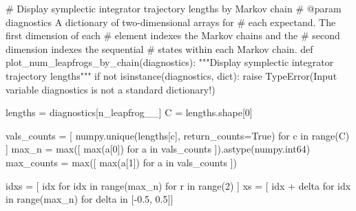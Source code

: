 \documentclass[
  letterpaper,
  DIV=11,
  numbers=noendperiod]{scrartcl}
\newenvironment{Shaded}{\begin{snugshade}}{\end{snugshade}}
\newcommand{\BuiltInTok}[1]{\textcolor[rgb]{0.00,0.23,0.31}{#1}}
\newcommand{\CommentTok}[1]{\textcolor[rgb]{0.37,0.37,0.37}{#1}}
\newcommand{\ControlFlowTok}[1]{\textcolor[rgb]{0.00,0.23,0.31}{#1}}
\newcommand{\DecValTok}[1]{\textcolor[rgb]{0.68,0.00,0.00}{#1}}
\newcommand{\FloatTok}[1]{\textcolor[rgb]{0.68,0.00,0.00}{#1}}
\newcommand{\KeywordTok}[1]{\textcolor[rgb]{0.00,0.23,0.31}{#1}}
\newcommand{\NormalTok}[1]{\textcolor[rgb]{0.00,0.23,0.31}{#1}}
\newcommand{\OperatorTok}[1]{\textcolor[rgb]{0.37,0.37,0.37}{#1}}
\newcommand{\PreprocessorTok}[1]{\textcolor[rgb]{0.68,0.00,0.00}{#1}}
\newcommand{\StringTok}[1]{\textcolor[rgb]{0.13,0.47,0.30}{#1}}
\newcommand{\VariableTok}[1]{\textcolor[rgb]{0.07,0.07,0.07}{#1}}
\begin{document}
\begin{Shaded}
\begin{Highlighting}[]
\CommentTok{\# Display symplectic integrator trajectory lengths by Markov chain}
\CommentTok{\# @param diagnostics A dictionary of two{-}dimensional arrays for}
\CommentTok{\#                    each expectand.  The first dimension of each}
\CommentTok{\#                    element indexes the Markov chains and the}
\CommentTok{\#                    second dimension indexes the sequential}
\CommentTok{\#                    states within each Markov chain.}
\KeywordTok{def}\NormalTok{ plot\_num\_leapfrogs\_by\_chain(diagnostics):}
  \CommentTok{"""Display symplectic integrator trajectory lengths"""}
  \ControlFlowTok{if} \KeywordTok{not} \BuiltInTok{isinstance}\NormalTok{(diagnostics, }\BuiltInTok{dict}\NormalTok{):}
    \ControlFlowTok{raise} \PreprocessorTok{TypeError}\NormalTok{(}\StringTok{\textquotesingle{}Input variable \textasciigrave{}diagnostics\textasciigrave{} is not a standard dictionary!\textquotesingle{}}\NormalTok{)}
  
\NormalTok{  lengths }\OperatorTok{=}\NormalTok{ diagnostics[}\StringTok{\textquotesingle{}n\_leapfrog\_\_\textquotesingle{}}\NormalTok{]}
\NormalTok{  C }\OperatorTok{=}\NormalTok{ lengths.shape[}\DecValTok{0}\NormalTok{]}
  
\NormalTok{  vals\_counts }\OperatorTok{=}\NormalTok{ [ numpy.unique(lengths[c], return\_counts}\OperatorTok{=}\VariableTok{True}\NormalTok{) }
                  \ControlFlowTok{for}\NormalTok{ c }\KeywordTok{in} \BuiltInTok{range}\NormalTok{(C) ] }
\NormalTok{  max\_n }\OperatorTok{=} \BuiltInTok{max}\NormalTok{([ }\BuiltInTok{max}\NormalTok{(a[}\DecValTok{0}\NormalTok{]) }\ControlFlowTok{for}\NormalTok{ a }\KeywordTok{in}\NormalTok{ vals\_counts ]).astype(numpy.int64)}
\NormalTok{  max\_counts }\OperatorTok{=} \BuiltInTok{max}\NormalTok{([ }\BuiltInTok{max}\NormalTok{(a[}\DecValTok{1}\NormalTok{]) }\ControlFlowTok{for}\NormalTok{ a }\KeywordTok{in}\NormalTok{ vals\_counts ])}
  
\NormalTok{  idxs }\OperatorTok{=}\NormalTok{ [ idx }\ControlFlowTok{for}\NormalTok{ idx }\KeywordTok{in} \BuiltInTok{range}\NormalTok{(max\_n) }\ControlFlowTok{for}\NormalTok{ r }\KeywordTok{in} \BuiltInTok{range}\NormalTok{(}\DecValTok{2}\NormalTok{) ]}
\NormalTok{  xs }\OperatorTok{=}\NormalTok{ [ idx }\OperatorTok{+}\NormalTok{ delta }\ControlFlowTok{for}\NormalTok{ idx }\KeywordTok{in} \BuiltInTok{range}\NormalTok{(max\_n) }\ControlFlowTok{for}\NormalTok{ delta }\KeywordTok{in}\NormalTok{ [}\OperatorTok{{-}}\FloatTok{0.5}\NormalTok{, }\FloatTok{0.5}\NormalTok{]]}
  

\end{Highlighting}
\end{Shaded}
\end{document}
